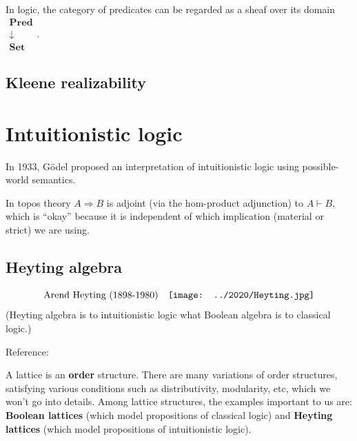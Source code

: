 In logic, the category of predicates can be regarded as a sheaf over its domain $\mathrel{\substack{\mathbf{Pred}\\\downarrow\\\mathbf{Set}}}$.


\subsection{Kleene realizability}

\underconst

\section{Intuitionistic logic}

In 1933, G\"{o}del proposed an interpretation of intuitionistic logic using possible-world semantics.

In topos theory $A \Rightarrow B$ is adjoint (via the hom-product adjunction) to $A \vdash B$, which is ``okay'' because it is independent of which implication (material or strict) we are using.

\subsection{Heyting algebra}

\begin{equation}
\mbox{Arend Heyting (1898-1980)} \quad 
\vcenter{\hbox{\texttt{[image: ../2020/Heyting.jpg]}}}
\end{equation}
(Heyting algebra is to intuitionistic logic what Boolean algebra is to classical logic.)

Reference: \parencite{Dunn2001}

A lattice is an \textbf{order} structure.  There are many variations of order structures, satisfying various conditions such as distributivity, modularity, etc, which we won't go into details.  Among lattice structures, the examples important to us are: \textbf{Boolean lattices} (which model propositions of classical logic) and \textbf{Heyting lattices} (which model propositions of intuitionistic logic).  

